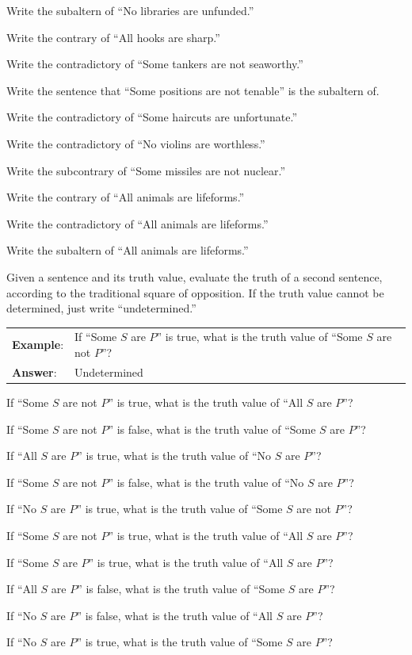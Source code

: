 \begin{exercises}
\item Write the subaltern of ``No libraries are unfunded.'' 
\item Write the contrary of ``All hooks are sharp.''
\item Write the contradictory of ``Some tankers are not seaworthy.'' 
\item Write the sentence that ``Some positions are not tenable'' is the subaltern of.  
\item Write the contradictory of ``Some haircuts are unfortunate.'' 
\item Write the contradictory of ``No violins are worthless.'' 
\item Write the subcontrary of ``Some missiles are not nuclear.'' 
\item Write the contrary of ``All animals are lifeforms.'' 
\item Write the contradictory of ``All animals are lifeforms.'' 
\item Write the subaltern of ``All animals are lifeforms.'' 
\end{exercises}

\noindent \problempart Given a sentence and its truth value, evaluate the truth of a second sentence, according to the traditional square of opposition. If the truth value cannot be determined, just write ``undetermined.''

\begin{longtabu}{p{.1\linewidth}p{.9\linewidth}}
\textbf{Example}: & If ``Some $S$ are $P$'' is true, what is the truth value of ``Some $S$ are not $P$''?\\
\textbf{Answer}: & Undetermined\\
\end{longtabu}

\begin{exercises}
\item If ``Some $S$ are not $P$'' is true, what is the truth value of ``All $S$ are $P$''?
\item If ``Some $S$ are not $P$'' is false, what is the truth value of ``Some $S$ are $P$''?
\item If ``All $S$ are $P$'' is true, what is the truth value of ``No $S$ are $P$''? 
\item If ``Some $S$ are not $P$'' is false, what is the truth value of ``No $S$ are $P$''?  
\item If ``No $S$ are $P$'' is true, what is the truth value of ``Some $S$ are not $P$''? 
\item If ``Some $S$ are not $P$'' is true, what is the truth value of ``All $S$ are $P$''? 
\item If ``Some $S$ are $P$'' is true, what is the truth value of ``All $S$ are $P$''? 
\item If ``All $S$ are $P$'' is false, what is the truth value of ``Some $S$ are $P$''? 
\item If ``No $S$ are $P$'' is false, what is the truth value of ``All $S$ are $P$''?
\item If ``No $S$ are $P$'' is true, what is the truth value of ``Some $S$ are $P$''?
\end{exercises}


